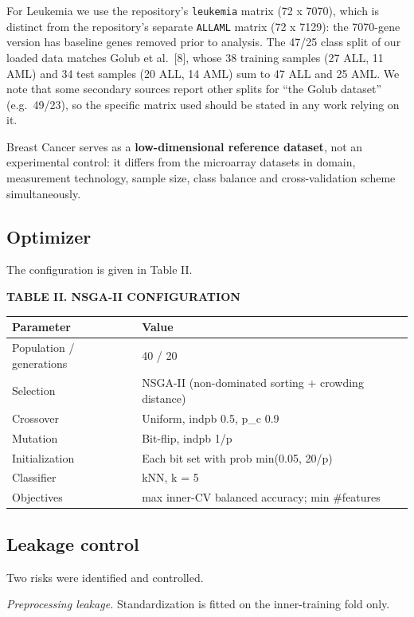 \documentclass[conference]{IEEEtran}
\begin{document}
For Leukemia we use the repository's \texttt{leukemia} matrix (72 x 7070), which is distinct from the repository's separate \texttt{ALLAML} matrix (72 x 7129): the 7070-gene version has baseline genes removed prior to analysis. The 47/25 class split of our loaded data matches Golub et al.~[8], whose 38 training samples (27 ALL, 11 AML) and 34 test samples (20 ALL, 14 AML) sum to 47 ALL and 25 AML. We note that some secondary sources report other splits for ``the Golub dataset'' (e.g.~49/23), so the specific matrix used should be stated in any work relying on it.

Breast Cancer serves as a \textbf{low-dimensional reference dataset}, not an experimental control: it differs from the microarray datasets in domain, measurement technology, sample size, class balance and cross-validation scheme simultaneously.

\subsection{Optimizer}

The configuration is given in Table II.

\textbf{TABLE II. NSGA-II CONFIGURATION}

\begin{table}[t]\centering\scriptsize
\begin{tabular}[]{@{}ll@{}}
\hline
Parameter & Value \\
\hline
\hline
Population / generations & 40 / 20 \\
Selection & NSGA-II (non-dominated sorting + crowding distance) \\
Crossover & Uniform, indpb 0.5, p\_c 0.9 \\
Mutation & Bit-flip, indpb 1/p \\
Initialization & Each bit set with prob min(0.05, 20/p) \\
Classifier & kNN, k = 5 \\
Objectives & max inner-CV balanced accuracy; min \#features \\
\end{tabular}
\end{table}


\subsection{Leakage control}

Two risks were identified and controlled.

\emph{Preprocessing leakage.} Standardization is fitted on the inner-training fold only.
\end{document}
